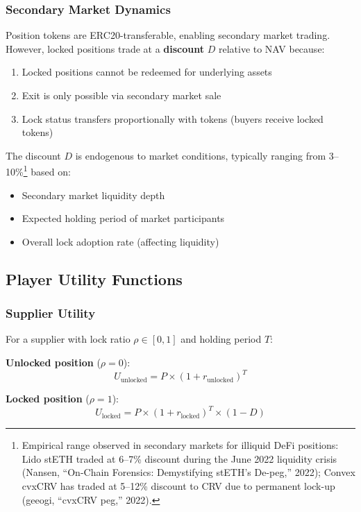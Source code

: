 \documentclass[10pt,a4paper,twocolumn]{article}
\theoremstyle{definition}
\theoremstyle{plain}
\theoremstyle{remark}
\begin{document}
\subsubsection{Secondary Market Dynamics}

Position tokens are ERC20-transferable, enabling secondary market trading. However, locked positions trade at a \textbf{discount} $D$ relative to NAV because:
\begin{enumerate}
    \item Locked positions cannot be redeemed for underlying assets
    \item Exit is only possible via secondary market sale
    \item Lock status transfers proportionally with tokens (buyers receive locked tokens)
\end{enumerate}

The discount $D$ is endogenous to market conditions, typically ranging from 3--10\%\footnote{Empirical range observed in secondary markets for illiquid DeFi positions: Lido stETH traded at 6--7\% discount during the June 2022 liquidity crisis (Nansen, ``On-Chain Forensics: Demystifying stETH's De-peg,'' 2022); Convex cvxCRV has traded at 5--12\% discount to CRV due to permanent lock-up (geeogi, ``cvxCRV peg,'' 2022).} based on:
\begin{itemize}
    \item Secondary market liquidity depth
    \item Expected holding period of market participants
    \item Overall lock adoption rate (affecting liquidity)
\end{itemize}

\subsection{Player Utility Functions}

\subsubsection{Supplier Utility}

For a supplier with lock ratio $\rho \in [0,1]$ and holding period $T$:

\textbf{Unlocked position} ($\rho = 0$):
\begin{equation}
U_{\text{unlocked}} = P \times (1 + r_{\text{unlocked}})^T
\end{equation}

\textbf{Locked position} ($\rho = 1$):
\begin{equation}
U_{\text{locked}} = P \times (1 + r_{\text{locked}})^T \times (1 - D)
\end{equation}
\end{document}

